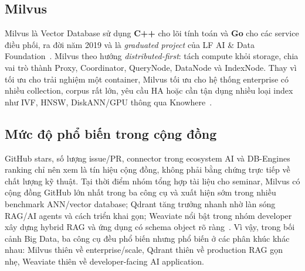 \subsection{Milvus}

Milvus là Vector Database sử dụng \textbf{C++} cho lõi tính toán và \textbf{Go} cho các service điều phối, ra đời năm 2019 và là \textit{graduated project} của LF AI \& Data Foundation~\cite{wang2021milvus}. Milvus theo hướng \textit{distributed-first}: tách compute khỏi storage, chia vai trò thành Proxy, Coordinator, QueryNode, DataNode và IndexNode. Thay vì tối ưu cho trải nghiệm một container, Milvus tối ưu cho hệ thống enterprise có nhiều collection, corpus rất lớn, yêu cầu HA hoặc cần tận dụng nhiều loại index như IVF, HNSW, DiskANN/GPU thông qua Knowhere~\cite{milvusdocs}.

\subsection{Mức độ phổ biến trong cộng đồng}

GitHub stars, số lượng issue/PR, connector trong ecosystem AI và DB-Engines ranking chỉ nên xem là tín hiệu cộng đồng, không phải bằng chứng trực tiếp về chất lượng kỹ thuật. Tại thời điểm nhóm tổng hợp tài liệu cho seminar, Milvus có cộng đồng GitHub lớn nhất trong ba công cụ và xuất hiện sớm trong nhiều benchmark ANN/vector database; Qdrant tăng trưởng nhanh nhờ làn sóng RAG/AI agents và cách triển khai gọn; Weaviate nổi bật trong nhóm developer xây dựng hybrid RAG và ứng dụng có schema object rõ ràng~\cite{dbengines}. Vì vậy, trong bối cảnh Big Data, ba công cụ đều phổ biến nhưng phổ biến ở các phân khúc khác nhau: Milvus thiên về enterprise/scale, Qdrant thiên về production RAG gọn nhẹ, Weaviate thiên về developer-facing AI application.

\begin{table}[H]
\centering
\caption{Tổng quan thiết kế và phân khúc sử dụng của ba Vector Database.}
\label{tab:overview}
\end{table}
